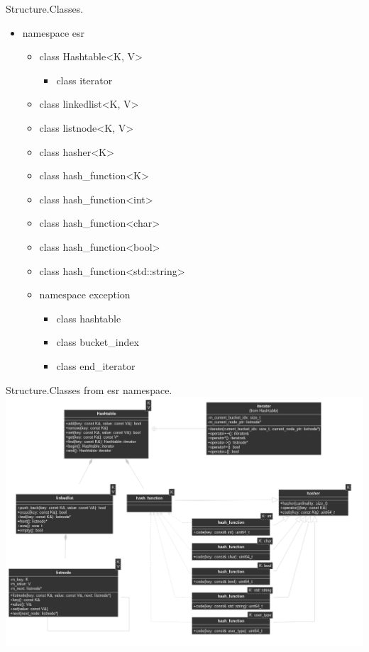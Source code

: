 \documentclass{beamer}
\begin{document}
\begin{frame}{Structure.}{Classes.}
  \begin{itemize}
  \item namespace esr
    \begin{itemize}
      \item class Hashtable<K, V>
        \begin{itemize}
          \item class iterator
        \end{itemize}
      \item class linkedlist<K, V>
      \item class listnode<K, V>
      \item class hasher<K>
      \item class hash\_function<K>
      \item class hash\_function<int>
      \item class hash\_function<char>
      \item class hash\_function<bool>
      \item class hash\_function<std::string>
      \item namespace exception
        \begin{itemize}
          \item class hashtable
          \item class bucket\_index 
          \item class end\_iterator
        \end{itemize}
    \end{itemize}
  \end{itemize}
\end{frame}


\begin{frame}{Structure.}{Classes from esr namespace.}
    \includegraphics[scale=0.3]{structure_classes}
\end{frame}
\end{document}
